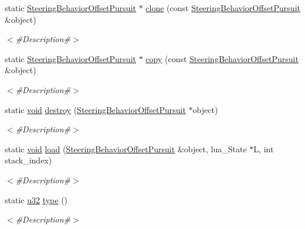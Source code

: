 \begin{DoxyCompactItemize}
static \mbox{\hyperlink{classnjli_1_1_steering_behavior_offset_pursuit}{Steering\+Behavior\+Offset\+Pursuit}} $\ast$ \mbox{\hyperlink{classnjli_1_1_steering_behavior_offset_pursuit_a480c07a4694dcc7dbefbb698d5d22a76}{clone}} (const \mbox{\hyperlink{classnjli_1_1_steering_behavior_offset_pursuit}{Steering\+Behavior\+Offset\+Pursuit}} \&object)
\begin{DoxyCompactList}\small\item\em $<$\#\+Description\#$>$ \end{DoxyCompactList}\item 
static \mbox{\hyperlink{classnjli_1_1_steering_behavior_offset_pursuit}{Steering\+Behavior\+Offset\+Pursuit}} $\ast$ \mbox{\hyperlink{classnjli_1_1_steering_behavior_offset_pursuit_a37e95a44ceacb1e5cbcf2b496743db3f}{copy}} (const \mbox{\hyperlink{classnjli_1_1_steering_behavior_offset_pursuit}{Steering\+Behavior\+Offset\+Pursuit}} \&object)
\begin{DoxyCompactList}\small\item\em $<$\#\+Description\#$>$ \end{DoxyCompactList}\item 
static \mbox{\hyperlink{_thread_8h_af1e856da2e658414cb2456cb6f7ebc66}{void}} \mbox{\hyperlink{classnjli_1_1_steering_behavior_offset_pursuit_abe5f7e51560e93559d731e707a5603ad}{destroy}} (\mbox{\hyperlink{classnjli_1_1_steering_behavior_offset_pursuit}{Steering\+Behavior\+Offset\+Pursuit}} $\ast$object)
\begin{DoxyCompactList}\small\item\em $<$\#\+Description\#$>$ \end{DoxyCompactList}\item 
static \mbox{\hyperlink{_thread_8h_af1e856da2e658414cb2456cb6f7ebc66}{void}} \mbox{\hyperlink{classnjli_1_1_steering_behavior_offset_pursuit_afc6402dae3350adee0ea1e0a3380c573}{load}} (\mbox{\hyperlink{classnjli_1_1_steering_behavior_offset_pursuit}{Steering\+Behavior\+Offset\+Pursuit}} \&object, lua\+\_\+\+State $\ast$L, int stack\+\_\+index)
\begin{DoxyCompactList}\small\item\em $<$\#\+Description\#$>$ \end{DoxyCompactList}\item 
static \mbox{\hyperlink{_util_8h_a10e94b422ef0c20dcdec20d31a1f5049}{u32}} \mbox{\hyperlink{classnjli_1_1_steering_behavior_offset_pursuit_a23f3c1239ab265f2bb615d87fae18189}{type}} ()
\begin{DoxyCompactList}\small\item\em $<$\#\+Description\#$>$ \end{DoxyCompactList}\end{DoxyCompactItemize}
